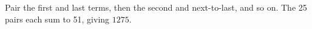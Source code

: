 Pair the first and last terms, then the second and next-to-last, and so on. The 25 pairs each sum to 51, giving $\boxed{1275}$.
